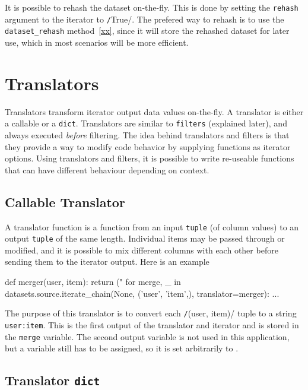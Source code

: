 It is possible to rehash the dataset on-the-fly.  This is done by
setting the \texttt{rehash} argument to the iterator to
\texttt/True/.  The prefered way to rehash is to use the
\texttt{dataset\_rehash} method~\ref{xx}, since it will store the
rehashed dataset for later use, which in most scenarios will be more
efficient.


\section{Translators}

Translators transform iterator output data values on-the-fly.  A
translator is either a callable or a \texttt{dict}.  Translators are
similar to \texttt{filters} (explained later), and always
executed \emph{before} filtering.  The idea behind translators and
filters is that they provide a way to modify code behavior by
supplying functions as iterator options.  Using translators and
filters, it is possible to write re-useable functions that can have
different behaviour depending on context.


\subsection*{Callable Translator}

A translator function is a function from an input \texttt{tuple} (of
column values) to an output \texttt{tuple} of the same length.
Individual items may be passed through or modified, and it is possible
to mix different columns with each other before sending them to the
iterator output.  Here is an example
\begin{python}
def merger(user, item):
    return ("%
for merge, _ in datasets.source.iterate_chain(None, ('user', 'item',),
                                     translator=merger):
    ...
\end{python}
The purpose of this translator is to convert each
\texttt/(user, item)/ tuple to a string \texttt{user:item}.  This is
the first output of the translator and iterator and is stored in the
\texttt{merge} variable.  The second output variable is not used in
this application, but a variable still has to be assigned, so it is
set arbitrarily to \pyNone.



\subsection*{Translator \texttt{dict}}

